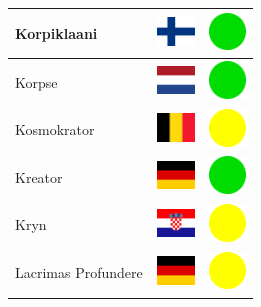 \documentclass[12pt, a4paper, twoside]{report}
\begin{document}
\begin{center}
\begin{longtable}{|p{5cm}|p{2cm}|p{2cm}|}
Korpiklaani & \includegraphics[width=1cm]{4x3/fi} & \includegraphics[width=1cm]{likes/y} \\ \hline
Korpse & \includegraphics[width=1cm]{4x3/nl} & \includegraphics[width=1cm]{likes/y} \\ \hline
Kosmokrator & \includegraphics[width=1cm]{4x3/be} & \includegraphics[width=1cm]{likes/m} \\ \hline
Kreator & \includegraphics[width=1cm]{4x3/de} & \includegraphics[width=1cm]{likes/y} \\ \hline
Kryn & \includegraphics[width=1cm]{4x3/hr} & \includegraphics[width=1cm]{likes/m} \\ \hline
Lacrimas Profundere & \includegraphics[width=1cm]{4x3/de} & \includegraphics[width=1cm]{likes/m} \\ \hline

\end{longtable}
\end{center}
\end{document}
